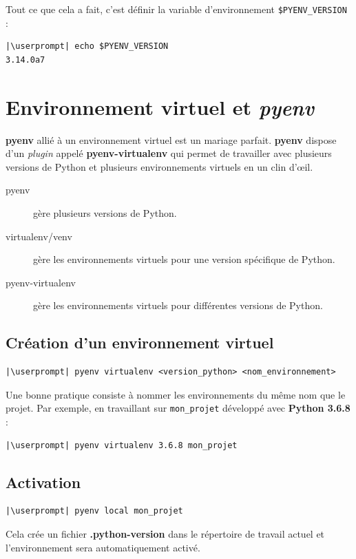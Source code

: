 Tout ce que cela a fait, c'est définir la variable d'environnement \texttt{\$PYENV\_VERSION} :
\begin{lstlisting}[style=bash]
|\userprompt| echo $PYENV_VERSION
3.14.0a7
\end{lstlisting}

\section{Environnement virtuel et \textit{pyenv}}
\textbf{pyenv} allié à un environnement virtuel est un mariage parfait. \textbf{pyenv} dispose d'un \textit{plugin} appelé \textbf{pyenv-virtualenv} qui permet de travailler avec plusieurs versions de Python et plusieurs environnements virtuels en un clin d'œil.
\begin{description}
    \item[pyenv] gère plusieurs versions de Python.
    \item[virtualenv/venv] gère les environnements virtuels pour une version spécifique de Python.
    \item[pyenv-virtualenv] gère les environnements virtuels pour différentes versions de Python.
\end{description}

\subsection*{Création d'un environnement virtuel}
\begin{lstlisting}[style=bash]
|\userprompt| pyenv virtualenv <version_python> <nom_environnement>
\end{lstlisting}

Une bonne pratique consiste à nommer les environnements du même nom que le projet. Par exemple, en travaillant sur \texttt{mon\_projet} développé avec \textbf{Python 3.6.8} :
\begin{lstlisting}[style=bash]
|\userprompt| pyenv virtualenv 3.6.8 mon_projet
\end{lstlisting}

\subsection*{Activation}
\begin{lstlisting}[style=bash]
|\userprompt| pyenv local mon_projet
\end{lstlisting}

Cela crée un fichier \textbf{.python-version} dans le répertoire de travail actuel et l'environnement sera automatiquement activé.

